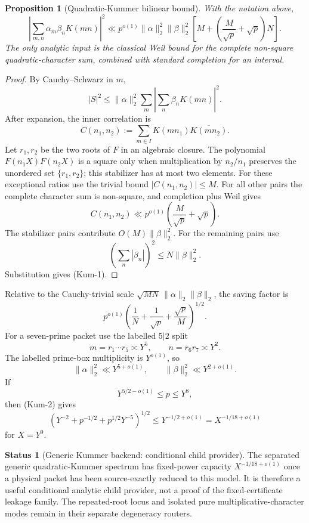 \documentclass[11pt]{article}
\newtheorem{proposition}[theorem]{Proposition}
\theoremstyle{definition}
\newtheorem{status}[theorem]{Status}
\theoremstyle{remark}
\newcommand{\1}{\mathbf 1}
\begin{document}
\begin{proposition}[Quadratic-Kummer bilinear bound]\label{prop:kummer-bilin}
With the notation above,
\[
 \boxed{
 \left|\sum_{m,n}\alpha_m\beta_nK(mn)\right|^2
 \ll p^{o(1)}\|\alpha\|_2^2\|\beta\|_2^2
 \left[M+\left(\frac{M}{\sqrt p}+\sqrt p\right)N\right].}
 \tag{Kum-1}
\]
The only analytic input is the classical Weil bound for the complete non-square quadratic-character sum,
combined with standard completion for an interval.
\end{proposition}
\begin{proof}
By Cauchy--Schwarz in $m$,
\[
 |S|^2\le\|\alpha\|_2^2
 \sum_m\left|\sum_n\beta_nK(mn)\right|^2.
\]
After expansion, the inner correlation is
\[
 C(n_1,n_2):=\sum_{m\in I}K(mn_1)\overline{K(mn_2)}.
\]
Let $r_1,r_2$ be the two roots of $F$ in an algebraic closure.  The polynomial
$F(n_1X)F(n_2X)$ is a square only when multiplication by $n_2/n_1$ preserves the unordered set
$\{r_1,r_2\}$; this stabilizer has at most two elements.  For these exceptional ratios use the trivial bound
$|C(n_1,n_2)|\le M$.  For all other pairs the complete character sum is non-square, and completion plus Weil
gives
\[
 C(n_1,n_2)\ll p^{o(1)}\left(\frac{M}{\sqrt p}+\sqrt p\right).
\]
The stabilizer pairs contribute $O(M)\|\beta\|_2^2$.  For the remaining pairs use
\[
 \left(\sum_n|\beta_n|\right)^2\le N\|\beta\|_2^2.
\]
Substitution gives (Kum-1).
\end{proof}

Relative to the Cauchy-trivial scale $\sqrt{MN}\,\|\alpha\|_2\|\beta\|_2$, the saving factor is
\[
 p^{o(1)}\left(\frac1N+\frac1{\sqrt p}+\frac{\sqrt p}{M}\right)^{1/2}.
 \tag{Kum-2}
\]
For a seven-prime packet use the labelled $5|2$ split
\[
 m=r_1\cdots r_5\asymp Y^5,\qquad n=r_6r_7\asymp Y^2.
\]
The labelled prime-box multiplicity is $Y^{o(1)}$, so
\[
 \|\alpha\|_2^2\ll Y^{5+o(1)},\qquad
 \|\beta\|_2^2\ll Y^{2+o(1)}.
\]
If
\[
 Y^{5/2-o(1)}\le p\le Y^8,
\]
then (Kum-2) gives
\[
 \left(Y^{-2}+p^{-1/2}+p^{1/2}Y^{-5}\right)^{1/2}
 \le Y^{-1/2+o(1)}=X^{-1/18+o(1)}
\]
for $X=Y^9$.

\begin{status}[Generic Kummer backend: conditional child provider]
The separated generic quadratic-Kummer spectrum has fixed-power capacity $X^{-1/18+o(1)}$ once a physical
packet has been source-exactly reduced to this model.  It is therefore a useful conditional analytic child
provider, not a proof of the fixed-certificate leakage family.  The repeated-root locus and isolated pure
multiplicative-character modes remain in their separate degeneracy routers.
\end{status}
\end{document}

